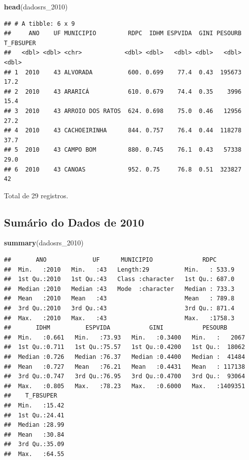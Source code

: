 \documentclass[]{article}
\newenvironment{Shaded}{\begin{snugshade}}{\end{snugshade}}
\newcommand{\KeywordTok}[1]{\textcolor[rgb]{0.13,0.29,0.53}{\textbf{#1}}}
\newcommand{\DecValTok}[1]{\textcolor[rgb]{0.00,0.00,0.81}{#1}}
\newcommand{\NormalTok}[1]{#1}
\begin{document}
\begin{Shaded}
\begin{Highlighting}[]
\KeywordTok{head}\NormalTok{(dadosrs_}\DecValTok{2010}\NormalTok{)}
\end{Highlighting}
\end{Shaded}

\begin{verbatim}
## # A tibble: 6 x 9
##     ANO    UF MUNICIPIO         RDPC  IDHM ESPVIDA  GINI PESOURB T_FBSUPER
##   <dbl> <dbl> <chr>            <dbl> <dbl>   <dbl> <dbl>   <dbl>     <dbl>
## 1  2010    43 ALVORADA          600. 0.699    77.4  0.43  195673      17.2
## 2  2010    43 ARARICÁ           610. 0.679    74.4  0.35    3996      15.4
## 3  2010    43 ARROIO DOS RATOS  624. 0.698    75.0  0.46   12956      27.2
## 4  2010    43 CACHOEIRINHA      844. 0.757    76.4  0.44  118278      37.7
## 5  2010    43 CAMPO BOM         880. 0.745    76.1  0.43   57338      29.0
## 6  2010    43 CANOAS            952. 0.75     76.8  0.51  323827      42
\end{verbatim}

Total de 29 registros.

\subsection{Sumário do Dados de 2010}\label{sumario-do-dados-de-2010}

\begin{Shaded}
\begin{Highlighting}[]
\KeywordTok{summary}\NormalTok{(dadosrs_}\DecValTok{2010}\NormalTok{)}
\end{Highlighting}
\end{Shaded}

\begin{verbatim}
##       ANO             UF      MUNICIPIO              RDPC       
##  Min.   :2010   Min.   :43   Length:29          Min.   : 533.9  
##  1st Qu.:2010   1st Qu.:43   Class :character   1st Qu.: 687.0  
##  Median :2010   Median :43   Mode  :character   Median : 733.3  
##  Mean   :2010   Mean   :43                      Mean   : 789.8  
##  3rd Qu.:2010   3rd Qu.:43                      3rd Qu.: 871.4  
##  Max.   :2010   Max.   :43                      Max.   :1758.3  
##       IDHM          ESPVIDA           GINI           PESOURB       
##  Min.   :0.661   Min.   :73.93   Min.   :0.3400   Min.   :   2067  
##  1st Qu.:0.711   1st Qu.:75.57   1st Qu.:0.4200   1st Qu.:  18062  
##  Median :0.726   Median :76.37   Median :0.4400   Median :  41484  
##  Mean   :0.727   Mean   :76.21   Mean   :0.4431   Mean   : 117138  
##  3rd Qu.:0.747   3rd Qu.:76.95   3rd Qu.:0.4700   3rd Qu.:  93064  
##  Max.   :0.805   Max.   :78.23   Max.   :0.6000   Max.   :1409351  
##    T_FBSUPER    
##  Min.   :15.42  
##  1st Qu.:24.41  
##  Median :28.99  
##  Mean   :30.84  
##  3rd Qu.:35.09  
##  Max.   :64.55
\end{verbatim}
\end{document}
